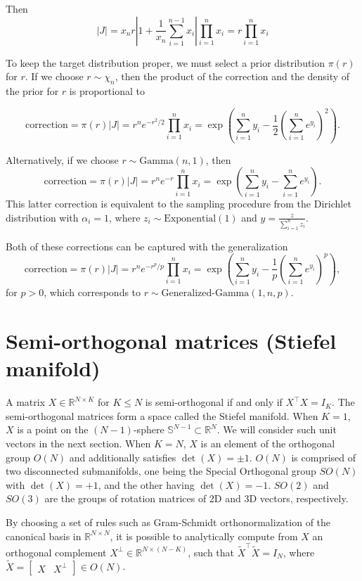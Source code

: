 \documentclass[11pt]{article}
\begin{document}
Then
\[
  |J| = x_n r \left|1 + \frac{1}{x_n}\sum_{i=1}^{n-1} x_i\right|
  \prod_{i=1}^n x_i = r \prod_{i=1}^n x_i
\]

To keep the target distribution proper, we must select a prior
distribution $\pi(r)$ for $r$.  If we choose $r \sim \chi_n$, then the
product of the correction and the density of the prior for $r$ is
proportional to

\[
  \mathrm{correction}
  = \pi(r) |J| = r^n e^{-r^2/2} \prod_{i=1}^n x_i
  = \exp\left(\sum_{i=1}^n y_i - \frac{1}{2}\left(\sum_{i=1}^n
      e^{y_i}\right)^2\right).
\]

Alternatively, if we choose $r \sim \mathrm{Gamma}(n, 1)$, then
\[
  \mathrm{correction} = \pi(r) |J| = r^n e^{-r} \prod_{i=1}^n x_i =
  \exp\left(\sum_{i=1}^n y_i - \sum_{i=1}^n e^{y_i}\right).
\]
This latter correction is equivalent to the sampling procedure from
the Dirichlet distribution with $\alpha_i=1$, where
$z_i \sim \mathrm{Exponential}(1)$ and
$y = \frac{z}{\sum_{i=1}^n z_i}$.

Both of these corrections can be captured with the generalization
\[
  \mathrm{correction}
  = \pi(r) |J|
  = r^n e^{-r^p/p} \prod_{i=1}^n x_i
  = \exp\left(\sum_{i=1}^n y_i - \frac{1}{p} \left(\sum_{i=1}^n e^{y_i}\right)^p\right),
\]
for $p > 0$, which corresponds to $r \sim \text{Generalized-Gamma}(1, n, p)$.

\section{Semi-orthogonal matrices (Stiefel manifold)}

A matrix $X \in \mathbb{R}^{N \times K}$ for $K \le N$ is semi-orthogonal if and only if $X^\top X = I_K$.
The semi-orthogonal matrices form a space called the Stiefel manifold.
When $K=1$, $X$ is a point on the $(N-1)$-sphere $\mathbb{S}^{N-1} \subset \mathbb{R}^N$.
We will consider such unit vectors in the next section.
When $K=N$, $X$ is an element of the orthogonal group $O(N)$ and additionally satisfies $\det(X) = \pm 1$.
$O(N)$ is comprised of two disconnected submanifolds, one being the Special Orthogonal group $SO(N)$ with $\det(X) = +1$, and the other having $\det(X) = -1$.
$SO(2)$ and $SO(3)$ are the groups of rotation matrices of 2D and 3D vectors, respectively.

By choosing a set of rules such as Gram-Schmidt orthonormalization of the canonical basis in $\mathbb{R}^{N \times N}$, it is possible to analytically compute from $X$ an orthogonal complement $X^\perp \in \mathbb{R}^{N \times (N - K)}$, such that $\tilde{X}^\top \tilde{X} = I_N$, where $\tilde{X} = \begin{bmatrix}X & X^\perp \end{bmatrix} \in O(N)$.
\end{document}
